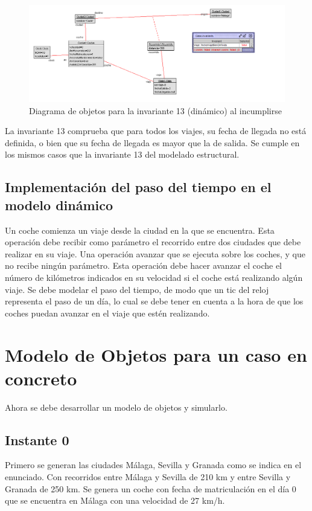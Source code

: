 \documentclass[12pt.a4paper]{article}
\begin{document}
\begin{figure}[H]
     \includegraphics[width=1\linewidth]{Soils/dinamico_inv13_false.png}
     \caption{Diagrama de objetos para la invariante 13 (dinámico) al incumplirse}
\end{figure}

La invariante 13 comprueba que para todos los viajes, su fecha de llegada no está definida, o bien que su fecha de llegada es mayor que la de salida. Se cumple en los mismos casos que la invariante 13 del modelado estructural.

    
\subsection{Implementación del paso del tiempo en el modelo dinámico}
Un coche comienza un viaje desde la ciudad en la que se encuentra. Esta operación debe recibir como parámetro el recorrido entre dos ciudades que debe realizar en su viaje.
Una operación avanzar que se ejecuta sobre los coches, y que no recibe ningún parámetro. Esta operación debe hacer avanzar el coche el número de kilómetros indicados en su velocidad si el coche está realizando algún viaje. Se debe modelar el paso del tiempo, de modo que un tic del reloj representa el paso de un día, lo cual se debe tener en cuenta a la hora de que los coches puedan avanzar en el viaje que estén realizando.

\section{Modelo de Objetos para un caso en concreto}
Ahora se debe desarrollar un modelo de objetos y simularlo.


\subsection{Instante 0}
Primero se generan las ciudades Málaga, Sevilla y Granada como se indica en el enunciado. Con recorridos entre Málaga y Sevilla de 210 km y entre Sevilla y Granada de 250 km. Se genera un coche con fecha de matriculación en el día 0 que se encuentra en Málaga con una velocidad de 27 km/h.
\end{document}
